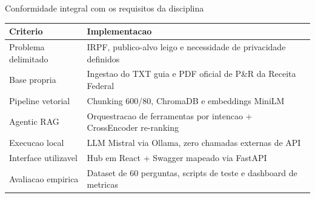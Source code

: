 \documentclass[aspectratio=169,12pt]{beamer}
\renewcommand{\arraystretch}{1.3}
\begin{document}
\begin{frame}{Conformidade integral com os requisitos da disciplina}
\renewcommand{\arraystretch}{1.2}
\begin{tabular}{@{}L{3.0cm}L{8.8cm}@{}}
  \toprule
  \textbf{Criterio} & \textbf{Implementacao} \\
  \midrule
  \textcolor{declaraTeal}{Problema delimitado} & IRPF, publico-alvo leigo e necessidade de privacidade definidos \\
  \textcolor{declaraTeal}{Base propria} & Ingestao do TXT guia e PDF oficial de P\&R da Receita Federal \\
  \textcolor{declaraTeal}{Pipeline vetorial} & Chunking 600/80, ChromaDB e embeddings MiniLM \\
  \textcolor{declaraTeal}{Agentic RAG} & Orquestracao de ferramentas por intencao + CrossEncoder re-ranking \\
  \textcolor{declaraTeal}{Execucao local} & LLM Mistral via Ollama, zero chamadas externas de API \\
  \textcolor{declaraTeal}{Interface utilizavel} & Hub em React + Swagger mapeado via FastAPI \\
  \textcolor{declaraTeal}{Avaliacao empirica} & Dataset de 60 perguntas, scripts de teste e dashboard de metricas \\
  \bottomrule
\end{tabular}
\end{frame}
\end{document}
